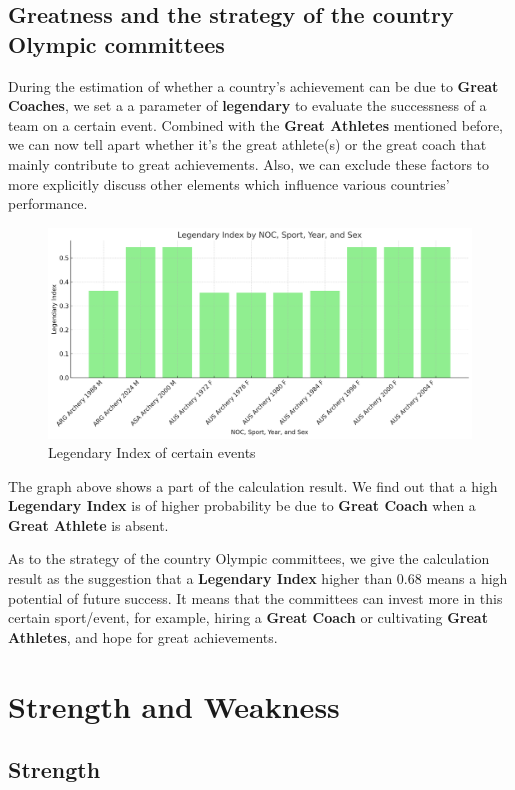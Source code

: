 \subsection{Greatness and the strategy of the country Olympic committees}
During the estimation of whether a country's achievement can be due to \textbf{Great Coaches}, we set a a parameter of \textbf{legendary} to evaluate the successness of a team on a certain event.
Combined with the \textbf{Great Athletes} mentioned before, we can now tell apart whether it's the great athlete(s) or the great coach that mainly contribute to great achievements.
Also, we can exclude these factors to more explicitly discuss other elements which influence various countries' performance.
\begin{figure}[h]
    \centering
    \includegraphics[width=1\textwidth]{./figures/Legendary_index.png}
    \caption{Legendary Index of certain events}
    \label{fig:legendary_index}
    \end{figure}
The graph above shows a part of the calculation result. We find out that a high \textbf{Legendary Index} is of higher probability be due to \textbf{Great Coach} when a \textbf{Great Athlete} is absent.

As to the strategy of the country Olympic committees, we give the calculation result as the suggestion that a \textbf{Legendary Index} higher than 0.68 means a high potential of future success.
It means that the committees can invest more in this certain sport/event, for example, hiring a \textbf{Great Coach} or cultivating \textbf{Great Athletes}, and hope for great achievements.\cite{jackson2014statistical}
\section{Strength and Weakness}

\subsection{Strength}

